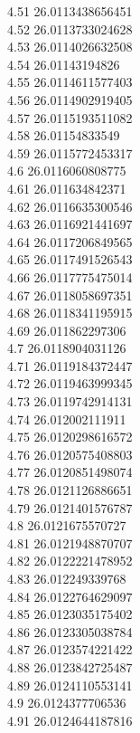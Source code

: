 {4.51	26.0113438656451\\
4.52	26.0113733024628\\
4.53	26.0114026632508\\
4.54	26.01143194826\\
4.55	26.0114611577403\\
4.56	26.0114902919405\\
4.57	26.0115193511082\\
4.58	26.01154833549\\
4.59	26.0115772453317\\
4.6	26.0116060808775\\
4.61	26.011634842371\\
4.62	26.0116635300546\\
4.63	26.0116921441697\\
4.64	26.0117206849565\\
4.65	26.0117491526543\\
4.66	26.0117775475014\\
4.67	26.0118058697351\\
4.68	26.0118341195915\\
4.69	26.011862297306\\
4.7	26.0118904031126\\
4.71	26.0119184372447\\
4.72	26.0119463999345\\
4.73	26.0119742914131\\
4.74	26.012002111911\\
4.75	26.0120298616572\\
4.76	26.0120575408803\\
4.77	26.0120851498074\\
4.78	26.0121126886651\\
4.79	26.0121401576787\\
4.8	26.0121675570727\\
4.81	26.0121948870707\\
4.82	26.0122221478952\\
4.83	26.012249339768\\
4.84	26.0122764629097\\
4.85	26.0123035175402\\
4.86	26.0123305038784\\
4.87	26.0123574221422\\
4.88	26.0123842725487\\
4.89	26.0124110553141\\
4.9	26.0124377706536\\
4.91	26.0124644187816\\
}
